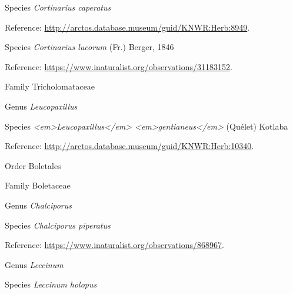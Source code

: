 \documentclass[9pt, article]{memoir}
\begin{document}
\begin{multicols}{2}
\vspace{6pt}\noindent\hspace{36pt}Species \textit{Cortinarius caperatus}


\vspace{6pt}Reference: 
\url{http://arctos.database.museum/guid/KNWR:Herb:8949}.

\vspace{6pt}\noindent\hspace{36pt}Species \textit{Cortinarius lucorum} (Fr.) Berger, 1846


\vspace{6pt}Reference: 
\url{https://www.inaturalist.org/observations/31183152}.

\vspace{6pt}\noindent\hspace{24pt}Family Tricholomataceae


\vspace{6pt}\noindent\hspace{30pt}Genus \textit{Leucopaxillus}


\vspace{6pt}\noindent\hspace{36pt}Species \textit{<em>Leucopaxillus</em> <em>gentianeus</em>} (Quélet) Kotlaba


\vspace{6pt}Reference: 
\url{http://arctos.database.museum/guid/KNWR:Herb:10340}.

\vspace{6pt}\noindent\hspace{18pt}Order Boletales


\vspace{6pt}\noindent\hspace{24pt}Family Boletaceae


\vspace{6pt}\noindent\hspace{30pt}Genus \textit{Chalciporus}


\vspace{6pt}\noindent\hspace{36pt}Species \textit{Chalciporus piperatus}


\vspace{6pt}Reference: 
\url{https://www.inaturalist.org/observations/868967}.

\vspace{6pt}\noindent\hspace{30pt}Genus \textit{Leccinum}


\vspace{6pt}\noindent\hspace{36pt}Species \textit{Leccinum holopus}



\end{multicols}
\end{document}
